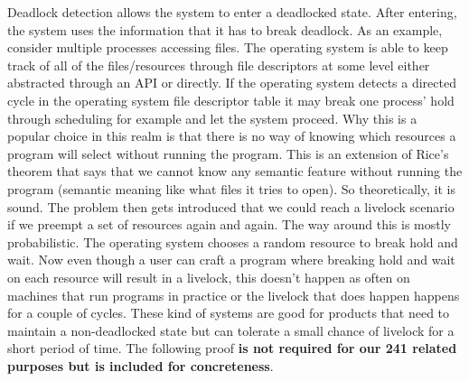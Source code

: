 Deadlock detection allows the system to enter a deadlocked state. After entering, the system uses the information that it has to break deadlock. As an example, consider multiple processes accessing files. The operating system is able to keep track of all of the files/resources through file descriptors at some level either abstracted through an API or directly. If the operating system detects a directed cycle in the operating system file descriptor table it may break one process' hold through scheduling for example and let the system proceed. Why this is a popular choice in this realm is that there is no way of knowing which resources a program will select without running the program. This is an extension of Rice's theorem \cite{rice} that says that we cannot know any semantic feature without running the program (semantic meaning like what files it tries to open). So theoretically, it is sound. The problem then gets introduced that we could reach a livelock scenario if we preempt a set of resources again and again. The way around this is mostly probabilistic. The operating system chooses a random resource to break hold and wait. Now even though a user can craft a program where breaking hold and wait on each resource will result in a livelock, this doesn't happen as often on machines that run programs in practice or the livelock that does happen happens for a couple of cycles. These kind of systems are good for products that need to maintain a non-deadlocked state but can tolerate a small chance of livelock for a short period of time. The following proof \textbf{is not required for our 241 related purposes but is included for concreteness}.

